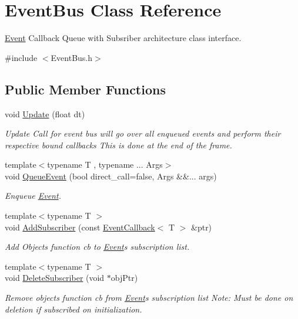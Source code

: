 \hypertarget{classEventBus}{}\section{Event\+Bus Class Reference}
\label{classEventBus}


\hyperlink{classEvent}{Event} Callback Queue with Subsriber architecture class interface.  




{\ttfamily \#include $<$Event\+Bus.\+h$>$}

\subsection*{Public Member Functions}
\begin{DoxyCompactItemize}
\item 
void \hyperlink{classEventBus_aa048bc41fb81f79ad8448c4d6c32bcf0}{Update} (float dt)
\begin{DoxyCompactList}\small\item\em Update Call for event bus will go over all enqueued events and perform their respective bound callbacks This is done at the end of the frame. \end{DoxyCompactList}\item 
{\footnotesize template$<$typename T , typename ... Args$>$ }\\void \hyperlink{classEventBus_a736833d1283bbb0ccfe25c2b2c054df9}{Queue\+Event} (bool direct\+\_\+call=false, Args \&\&... args)
\begin{DoxyCompactList}\small\item\em Enqueue \hyperlink{classEvent}{Event}. \end{DoxyCompactList}\item 
{\footnotesize template$<$typename T $>$ }\\void \hyperlink{classEventBus_aa979b8cf93f0bb8bf50d07422a3b15fe}{Add\+Subscriber} (const \hyperlink{classEventCallback}{Event\+Callback}$<$ T $>$ \&ptr)
\begin{DoxyCompactList}\small\item\em Add Object\textquotesingle{}s function cb to \hyperlink{classEvent}{Event}\textquotesingle{}s subscription list. \end{DoxyCompactList}\item 
{\footnotesize template$<$typename T $>$ }\\void \hyperlink{classEventBus_a59c30ad63d7daf82be43df5de1427bdb}{Delete\+Subscriber} (void $\ast$obj\+Ptr)
\begin{DoxyCompactList}\small\item\em Remove object\textquotesingle{}s function cb from \hyperlink{classEvent}{Event}\textquotesingle{}s subscription list Note\+: Must be done on deletion if subscribed on initialization. \end{DoxyCompactList}\end{DoxyCompactItemize}


